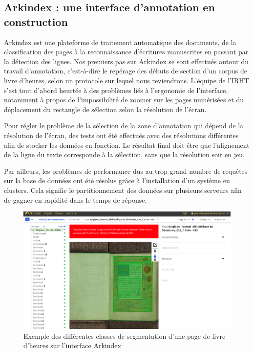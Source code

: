 \documentclass[a4paper,12pt,twoside]{book}
\begin{document}
	
	\subsection{\label{arkindex}Arkindex : une interface d’annotation en construction}
	
		Arkindex est une plateforme de traitement automatique des documents, de la classification des pages à la reconnaissance d’écritures manuscrites en passant par la détection des lignes. Nos premiers pas sur Arkindex se sont effectués autour du travail d'annotation, c'est-à-dire le repérage des débuts de section d'un corpus de livre d'heures, selon un protocole sur lequel nous reviendrons. L'équipe de l'IRHT s'est tout d'abord heurtée à des problèmes liés à l'ergonomie de l'interface, notamment à propos de l'impossibilité de zoomer sur les pages numérisées et du déplacement du rectangle de sélection selon la résolution de l'écran. 
		
	Pour régler le problème de la sélection de la zone d’annotation qui dépend de la résolution de l’écran, des tests ont été effectués avec des résolutions différentes afin de stocker les données en fonction. Le résultat final doit être que l'alignement de la ligne du texte corresponde à la sélection, sans que la résolution soit en jeu.
	
	 Par ailleurs, les problèmes de performance dus au trop grand nombre de requêtes sur la base de données ont été résolus grâce à l'installation d’un système en clusters. Cela signifie le partitionnement des données sur plusieurs serveurs afin de gagner en rapidité dans le temps de réponse. \\
	 
	\begin{figure}[!h]
    \centering
    \includegraphics[width=13cm]{img/ML/interface_arkindex_detection_page.png}

    \caption{Exemple des différentes classes de segmentation d'une page de livre d'heures sur l'interface Arkindex}
    \end{figure}
	
\end{document}
